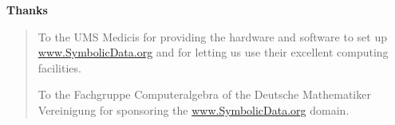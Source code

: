 \documentclass{slides}
\newcommand{\titel}[1]{\begin{center}\large\bf #1\end{center}}
\begin{document}
\titel{Thanks}

\begin{quote}\small 
To the UMS Medicis for providing the hardware and
software to set up \url{www.SymbolicData.org} and for letting us use
their excellent computing facilities.

To the Fachgruppe Computeralgebra of the Deutsche Mathematiker
Vereinigung for sponsoring the \url{www.SymbolicData.org} domain.
\end{quote}
\end{document}
